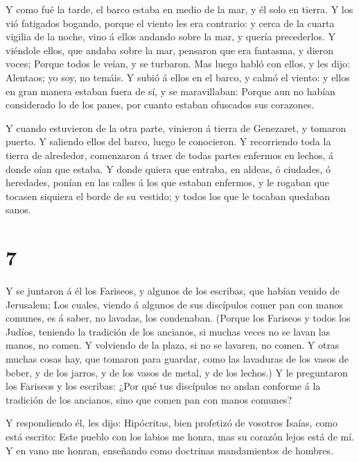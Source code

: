  Y como fué la tarde, el barco estaba en medio de la mar, y
él solo en tierra.  Y los vió fatigados bogando, porque el
viento les era contrario: y cerca de la cuarta vigilia de la noche, vino
á ellos andando sobre la mar, y quería precederlos.  Y
viéndole ellos, que andaba sobre la mar, pensaron que era fantasma, y
dieron voces;  Porque todos le veían, y se turbaron. Mas
luego habló con ellos, y les dijo: Alentaos; yo soy, no temáis.
 Y subió á ellos en el barco, y calmó el viento: y ellos en
gran manera estaban fuera de sí, y se maravillaban:  Porque
aun no habían considerado lo de los panes, por cuanto estaban ofuscados
sus corazones.

 Y cuando estuvieron de la otra parte, vinieron á tierra de
Genezaret, y tomaron puerto.  Y saliendo ellos del barco,
luego le conocieron.  Y recorriendo toda la tierra de
alrededor, comenzaron á traer de todas partes enfermos en lechos, á
donde oían que estaba.  Y donde quiera que entraba, en
aldeas, ó ciudades, ó heredades, ponían en las calles á los que estaban
enfermos, y le rogaban que tocasen siquiera el borde de su vestido; y
todos los que le tocaban quedaban sanos.

\hypertarget{section-6}{%
\section{7}\label{section-6}}

 Y se juntaron á él los Fariseos, y algunos de los escribas,
que habían venido de Jerusalem;  Los cuales, viendo á
algunos de sus discípulos comer pan con manos comunes, es á saber, no
lavadas, los condenaban.  (Porque los Fariseos y todos los
Judíos, teniendo la tradición de los ancianos, si muchas veces no se
lavan las manos, no comen.  Y volviendo de la plaza, si no
se lavaren, no comen. Y otras muchas cosas hay, que tomaron para
guardar, como las lavaduras de los vasos de beber, y de los jarros, y de
los vasos de metal, y de los lechos.)  Y le preguntaron los
Fariseos y los escribas: ¿Por qué tus discípulos no andan conforme á la
tradición de los ancianos, sino que comen pan con manos comunes?

 Y respondiendo él, les dijo: Hipócritas, bien profetizó de
vosotros Isaías, como está escrito: Este pueblo con los labios me honra,
mas su corazón lejos está de mí.  Y en vano me honran,
enseñando como doctrinas mandamientos de hombres.

